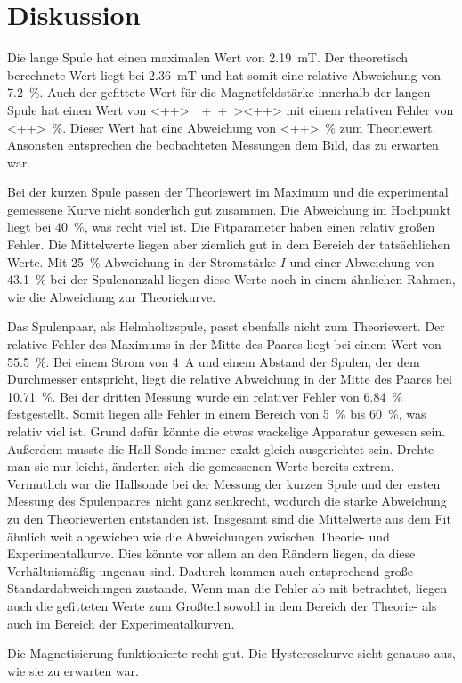 \section{Diskussion}
\label{sec:Diskussion}

Die lange Spule hat einen maximalen Wert von \SI{2.19}{\milli\tesla}. Der theoretisch berechnete Wert liegt bei %
\SI{2.36}{\milli\tesla} und hat somit eine relative Abweichung von \SI{7.2}{\percent}. Auch der gefittete Wert für die Magnetfeldstärke innerhalb der langen Spule hat einen Wert von \SI{<++>}{\<++>}<++> mit einem relativen Fehler von \SI{<++>}{\percent}. Dieser Wert hat eine Abweichung von \SI{<++>}{\percent} zum Theoriewert. Ansonsten entsprechen die 
beobachteten Messungen dem Bild, das zu erwarten war.

\noindent Bei der kurzen Spule passen der Theoriewert im Maximum und die experimental gemessene Kurve nicht sonderlich gut zusammen. Die Abweichung im 
Hochpunkt liegt bei \SI{40}{\percent}, was recht viel ist. Die Fitparameter haben einen relativ großen Fehler. Die Mittelwerte liegen aber ziemlich gut in dem Bereich der tatsächlichen Werte. Mit \SI{25}{\percent} Abweichung in der Stromstärke $I$ und einer Abweichung von \SI{43,1}{\percent} bei der Spulenanzahl liegen diese Werte noch in einem ähnlichen Rahmen, wie die Abweichung zur Theoriekurve.   

\noindent Das Spulenpaar, als Helmholtzspule, passt ebenfalls nicht zum Theoriewert. Der relative Fehler des Maximums in der Mitte 
des Paares liegt bei einem Wert von \SI{55.5}{\percent}. %
Bei einem Strom von \SI{4}{\ampere} und einem Abstand der Spulen, der dem Durchmesser entspricht, liegt die relative Abweichung in der Mitte des Paares bei \SI{10.71}{\percent}. %
Bei der dritten Messung wurde ein %
relativer Fehler von \SI{6.84}{\percent} festgestellt. Somit liegen alle Fehler in einem Bereich von \SI{5}{\percent} 
bis \SI{60}{\percent}, was relativ viel ist. Grund dafür könnte die etwas wackelige Apparatur gewesen sein. %
Außerdem musste die Hall-Sonde immer exakt gleich ausgerichtet sein. Drehte man sie nur leicht, änderten sich die %
gemessenen Werte bereits extrem.
\newline
Vermutlich war die Hallsonde bei der Messung der kurzen Spule und der ersten Messung %
des Spulenpaares nicht ganz senkrecht, wodurch die starke Abweichung zu den Theoriewerten entstanden ist. 
Insgesamt sind die Mittelwerte aus dem Fit ähnlich weit abgewichen wie die Abweichungen zwischen Theorie- und Experimentalkurve. Dies könnte vor allem an den Rändern liegen, da diese Verhältnismäßig ungenau sind. Dadurch kommen auch entsprechend große Standardabweichungen zustande. Wenn man die Fehler ab mit betrachtet, liegen auch die gefitteten Werte zum Großteil sowohl in dem Bereich der Theorie- als auch im Bereich der Experimentalkurven.

\noindent Die Magnetisierung funktionierte recht gut. Die Hysteresekurve sieht genauso aus, wie sie zu erwarten war. %
